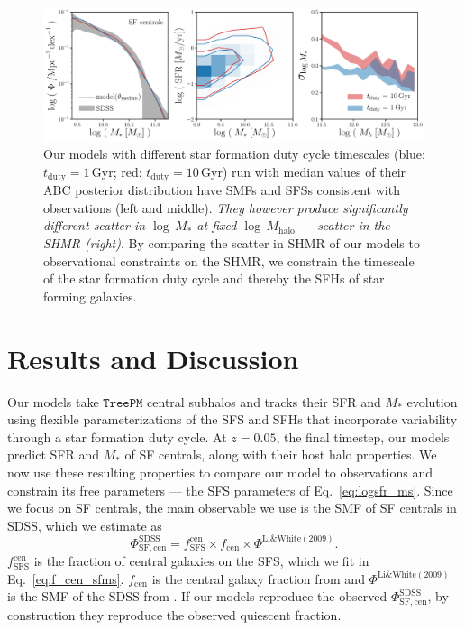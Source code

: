 \documentclass[12pt, letterpaper, preprint, tighten]{aastex62}
\newcommand{\beq}{\begin{equation}}
\newcommand{\eeq}{\end{equation}}
\begin{document}
\begin{figure}
\begin{center}
\includegraphics[width=\textwidth]{figs/qaplot_abc.pdf}
    \caption{Our models with different star formation duty cycle timescales
    (blue: $t_\mathrm{duty}{=}1\,\mathrm{Gyr}$; red: $t_\mathrm{duty}{=}10\,\mathrm{Gyr}$)
    run with median values of their ABC posterior distribution have SMFs and SFSs consistent
    with observations (left and middle). \emph{They however produce significantly different
    scatter in $\log\,M_*$ at fixed $\log\,M_\mathrm{halo}$ --- scatter in the SHMR (right)}.
    By comparing the scatter in SHMR of our models to observational constraints on the SHMR,
    we constrain the timescale of the star formation duty cycle and thereby the SFHs of star
    forming galaxies.
    }
\label{fig:abc_demo}
\end{center}
\end{figure}

\section{Results and Discussion} \label{sec:results}
Our models take $\mathtt{TreePM}$ central subhalos and tracks their SFR
and $M_*$ evolution using flexible parameterizations of the SFS and SFHs
that incorporate variability through a star formation duty cycle.
At $z = 0.05$, the final timestep, our models predict SFR and $M_*$ of SF
centrals, along with their host halo properties. We now use these resulting
properties to compare our model to observations and constrain its free
parameters --- the SFS parameters of Eq.~\ref{eq:logsfr_ms}. Since we focus
on SF centrals, the main observable we use is the SMF of SF centrals in
SDSS, which we estimate as
\beq \label{eq:smf_sf_cen}
\Phi^\mathrm{SDSS}_\mathrm{SF,cen} = f^\mathrm{cen}_\mathrm{SFS} \times f_\mathrm{cen} \times \Phi^\mathrm{Li\&White(2009)}.
\eeq
$f^\mathrm{cen}_\mathrm{SFS}$ is the fraction of central galaxies on the
SFS, which we fit in Eq.~\ref{eq:f_cen_sfms}. $f_\mathrm{cen}$ is the
central galaxy fraction from \cite{wetzel2013} and $\Phi^\mathrm{Li\&White(2009)}$
is the SMF of the SDSS from \cite{li2009}. If our models reproduce the
observed $\Phi^\mathrm{SDSS}_\mathrm{SF,cen}$, by construction they reproduce
the observed quiescent fraction.
\end{document}
